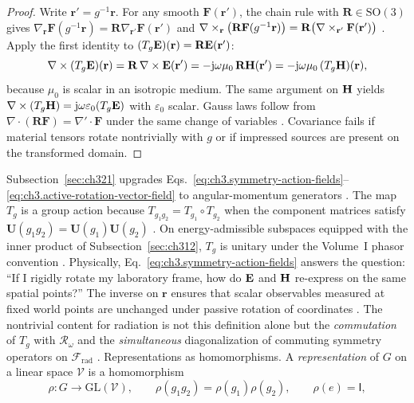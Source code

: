 \begin{proof}
Write $\mathbf{r}'=g^{-1}\mathbf{r}$. For any smooth $\mathbf{F}(\mathbf{r}')$, the chain rule with $\mathbf{R}\in\mathrm{SO}(3)$ gives
$\nabla_{\mathbf{r}}\mathbf{F}(g^{-1}\mathbf{r})=\mathbf{R}\nabla_{\mathbf{r}'}\mathbf{F}(\mathbf{r}')$
and $\nabla\times_{\mathbf{r}}\big(\mathbf{R}\mathbf{F}(g^{-1}\mathbf{r})\big)=\mathbf{R}\big(\nabla\times_{\mathbf{r}'}\mathbf{F}(\mathbf{r}')\big)$
\cite{jackson1999}. Apply the first identity to $(T_g\mathbf{E})(\mathbf{r})=\mathbf{R}\mathbf{E}(\mathbf{r}')$:
\begin{equation}
\label{eq:ch3.curl-rotated-E}
\nabla\times(T_g\mathbf{E})(\mathbf{r})
=
\mathbf{R}\,\nabla\times\mathbf{E}(\mathbf{r}')
=
-\mathrm{j}\omega\mu_0\,\mathbf{R}\mathbf{H}(\mathbf{r}')
=
-\mathrm{j}\omega\mu_0\,(T_g\mathbf{H})(\mathbf{r}),
\end{equation}
because $\mu_0$ is scalar in an isotropic medium. The same argument on $\mathbf{H}$ yields $\nabla\times(T_g\mathbf{H})=\mathrm{j}\omega\varepsilon_0(T_g\mathbf{E})$ with $\varepsilon_0$ scalar. Gauss laws follow from $\nabla\cdot(\mathbf{R}\mathbf{F})=\nabla'\cdot\mathbf{F}$ under the same change of variables \cite{stratton1941}. Covariance fails if material tensors rotate nontrivially with $g$ or if impressed sources are present on the transformed domain.
\end{proof}
Subsection~\ref{sec:ch321} upgrades Eqs.~\eqref{eq:ch3.symmetry-action-fields}--\eqref{eq:ch3.active-rotation-vector-field} to angular-momentum generators \cite{stratton1941}. The map \(T_g\) is a group action because \(T_{g_1g_2}=T_{g_1}\circ T_{g_2}\) when the component matrices satisfy \(\mathbf{U}(g_1g_2)=\mathbf{U}(g_1)\mathbf{U}(g_2)\) \cite{jackson1999}. On energy-admissible subspaces equipped with the inner product of Subsection~\ref{sec:ch312}, \(T_g\) is unitary under the Volume~I phasor convention \cite{stratton1941}.
Physically, Eq.~\eqref{eq:ch3.symmetry-action-fields} answers the question: ``If I rigidly rotate my laboratory frame, how do \(\mathbf{E}\) and \(\mathbf{H}\) re-express on the same spatial points?'' The inverse on \(\mathbf{r}\) ensures that scalar observables measured at fixed world points are unchanged under passive rotation of coordinates \cite{jackson1999}. The nontrivial content for radiation is not this definition alone but the \emph{commutation} of \(T_g\) with \(\mathcal{R}_\omega\) and the \emph{simultaneous} diagonalization of commuting symmetry operators on \(\mathcal{F}_{\mathrm{rad}}\) \cite{stratton1941}.
Representations as homomorphisms. A \emph{representation} of \(G\) on a linear space \(\mathcal{V}\) is a homomorphism
\begin{equation}
\label{eq:ch3.representation-homomorphism}
\rho:G\longrightarrow \mathrm{GL}(\mathcal{V}),
\qquad
\rho(g_1g_2)=\rho(g_1)\rho(g_2),
\qquad
\rho(e)=\mathsf{I},
\end{equation}
